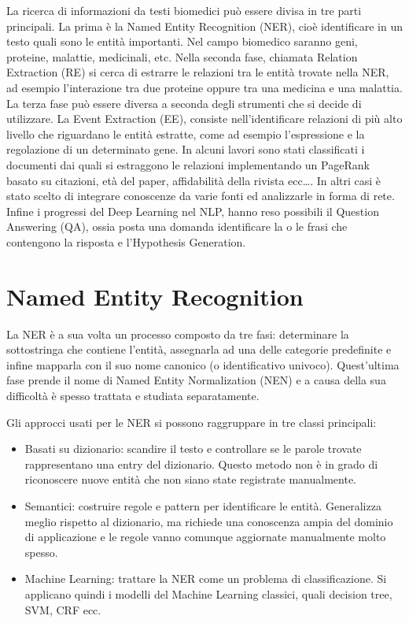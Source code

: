 \documentclass[12pt]{report}
\begin{document}
La ricerca di informazioni da testi biomedici può essere divisa in tre parti principali. La prima è la Named Entity Recognition (NER), cioè identificare in un testo quali sono le entità importanti. Nel campo biomedico saranno geni, proteine, malattie, medicinali, etc. Nella seconda fase, chiamata Relation Extraction (RE) si cerca di estrarre le relazioni tra le entità trovate nella NER, ad esempio l'interazione tra due proteine oppure tra una medicina e una malattia. La terza fase può essere diversa a seconda degli strumenti che si decide di utilizzare. La Event Extraction (EE), consiste nell'identificare relazioni di più alto livello che riguardano le entità estratte, come ad esempio l'espressione e la regolazione di un determinato gene. In alcuni lavori \cite{dtminer} sono stati classificati i documenti dai quali si estraggono le relazioni implementando un PageRank basato su citazioni, età del paper, affidabilità della rivista ecc\dots . In altri casi \cite{priami} è stato scelto di integrare conoscenze da varie fonti ed analizzarle in forma di rete.
Infine i progressi del Deep Learning nel NLP, hanno reso possibili il Question Answering (QA), ossia posta una domanda identificare la o le frasi che contengono la risposta e l'Hypothesis Generation.

\section{Named Entity Recognition \label{ner}}
La NER \cite{miningbook, recentadv} è a sua volta un processo composto da tre fasi: determinare la sottostringa che contiene l'entità, assegnarla ad una delle categorie predefinite e infine mapparla con il suo nome canonico (o identificativo univoco). Quest'ultima fase prende il nome di Named Entity Normalization (NEN) e a causa della sua difficoltà è spesso trattata e studiata separatamente.

Gli approcci usati per le NER si possono raggruppare in tre classi principali:
\begin{itemize}
    \item Basati su dizionario: scandire il testo e controllare se le parole trovate rappresentano una entry del dizionario. Questo metodo non è in grado di riconoscere nuove entità che non siano state registrate manualmente.
    \item Semantici: costruire regole e pattern per identificare le entità. Generalizza meglio rispetto al dizionario, ma richiede una conoscenza ampia del dominio di applicazione e le regole vanno comunque aggiornate manualmente molto spesso.
    \item Machine Learning: trattare la NER come un problema di classificazione. Si applicano quindi i modelli del Machine Learning classici, quali decision tree, SVM, CRF ecc.
\end{itemize}
\end{document}
